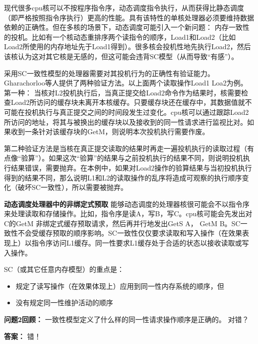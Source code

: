 \documentclass[UTF-8]{ctexrep}
\begin{document}
\par 现代很多cpu核可以不按程序指令序，动态调度指令执行，从而获得比静态调度（即严格按照指令序执行）更高的性能。具有该特性的单核处理器必须要维持数据依赖的正确性。但在多核的场景下，动态调度可能引入一个新问题： 内存一致性的投机。比如有一个核动态重排序两个读指令的顺序，Load1和Load2（比如Load2所使用的内存地址先于Load1得到）。很多核会投机性地先执行Load2，然后该核认为这对其它核是无感的，但这可能会违背SC模型（从而导致“有感”）。
\par 采用SC一致性模型的处理器需要对其投机行为的正确性有验证能力。Gharachorloo等人提供了两种验证方法。以上面两个读取操作Load1 Loa2为例。第一种： 当核对L2投机执行后，当真正提交给Load2命令作为结果时，核需要检查Load2所访问的缓存块未离开本核缓存。只要缓存块还在缓存中，其数据值就不可能在投机执行与真正提交之间的时间段发生过变化。cpu核可以通过跟踪Load2所访问的地址，将其与被换出的缓存块以及接收到的同一性请求进行监视比对。如果收到一条针对该缓存块的GetM，则说明本次投机执行需要作废。
\par 第二种验证方法是当核在真正提交读取的结果时再走一遍投机执行的读取过程（有点像“验算”）。如果这次“验算”的结果与之前投机执行的结果不同，则说明投机执行结果错误，需要抛弃。在本例中，如果对Load2操作的验算结果与当初投机执行得到的结果不同，那么说明L1和L2的读取操作的乱序将造成可观察的执行顺序变化（破坏SC一致性），所以需要被抛弃。
\par \textbf{动态调度处理器中的非绑定式预取}
能够动态调度的处理器核很可能会不以指令序来处理读取和存储操作。比如，指令序是读A，写B，写C。cpu核可能会先发出对C的GetM 非绑定式缓存预取请求，然后再并行地发出GetS A， GetM B。SC一致性不会受缓存预取的顺序影响。SC一致性仅仅要求读取和写入操作（在效果表现上）以指令序访问L1缓存。同一性要求L1缓存处于合适的状态以接收读取或写入操作。
\par SC（或其它任意内存模型）的重点是：
\begin{itemize}
\item 规定了读写操作（在效果体现上）应用到同一性内存系统的顺序，但
\item 没有规定同一性维护活动的顺序
\end{itemize}
\begin{sidebarbox}
\par \textbf {问题2回顾：} 一致性模型定义了什么样的同一性请求操作顺序是正确的。 对错？
\par \textbf{答案：} 错！
\end{sidebarbox}
 












\par















 
\end{document}
